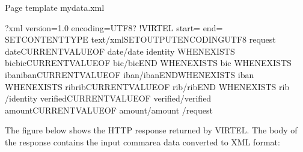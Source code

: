 \documentclass[letterpaper,10pt,english]{sphinxmanual}
\begin{document}
\begin{sphinxVerbatim}[commandchars=\\\{\}]
Page template mydata.xml

\PYGZlt{}?xml version=\PYGZdq{}1.0\PYGZdq{} encoding=\PYGZdq{}UTF\PYGZhy{}8\PYGZdq{}?\PYGZgt{}
\PYGZlt{}!\PYGZhy{}\PYGZhy{}VIRTEL start=\PYGZdq{}\PYGZob{}\PYGZob{}\PYGZob{}\PYGZdq{} end=\PYGZdq{}\PYGZcb{}\PYGZcb{}\PYGZcb{}\PYGZdq{} \PYGZhy{}\PYGZhy{}\PYGZgt{}
\PYGZob{}\PYGZob{}\PYGZob{} SET\PYGZhy{}CONTENT\PYGZhy{}TYPE \PYGZdq{}text/xml\PYGZdq{}\PYGZcb{}\PYGZcb{}\PYGZcb{}\PYGZob{}\PYGZob{}\PYGZob{}SET\PYGZhy{}OUTPUT\PYGZhy{}ENCODING\PYGZhy{}UTF\PYGZhy{}8 \PYGZdq{}\PYGZdq{}\PYGZcb{}\PYGZcb{}\PYGZcb{}
\PYGZlt{}request\PYGZgt{}
 \PYGZlt{}date\PYGZgt{}\PYGZob{}\PYGZob{}\PYGZob{}CURRENT\PYGZhy{}VALUE\PYGZhy{}OF \PYGZdq{}date\PYGZdq{}\PYGZcb{}\PYGZcb{}\PYGZcb{}\PYGZlt{}/date\PYGZgt{}
 \PYGZlt{}identity\PYGZgt{}
  \PYGZob{}\PYGZob{}\PYGZob{}WHEN\PYGZhy{}EXISTS \PYGZdq{}bic\PYGZdq{}\PYGZcb{}\PYGZcb{}\PYGZcb{}\PYGZlt{}bic\PYGZgt{}\PYGZob{}\PYGZob{}\PYGZob{}CURRENT\PYGZhy{}VALUE\PYGZhy{}OF \PYGZdq{}bic\PYGZdq{}\PYGZcb{}\PYGZcb{}\PYGZcb{}\PYGZlt{}/bic\PYGZgt{}\PYGZob{}\PYGZob{}\PYGZob{}END
 \PYGZhy{}WHEN\PYGZhy{}EXISTS \PYGZdq{}bic\PYGZdq{}\PYGZcb{}\PYGZcb{}\PYGZcb{}
  \PYGZob{}\PYGZob{}\PYGZob{}WHEN\PYGZhy{}EXISTS \PYGZdq{}iban\PYGZdq{}\PYGZcb{}\PYGZcb{}\PYGZcb{}\PYGZlt{}iban\PYGZgt{}\PYGZob{}\PYGZob{}\PYGZob{}CURRENT\PYGZhy{}VALUE\PYGZhy{}OF
 \PYGZdq{}iban\PYGZdq{}\PYGZcb{}\PYGZcb{}\PYGZcb{}\PYGZlt{}/iban\PYGZgt{}\PYGZob{}\PYGZob{}\PYGZob{}END\PYGZhy{}WHEN\PYGZhy{}EXISTS \PYGZdq{}iban\PYGZdq{}\PYGZcb{}\PYGZcb{}\PYGZcb{}
  \PYGZob{}\PYGZob{}\PYGZob{}WHEN\PYGZhy{}EXISTS \PYGZdq{}rib\PYGZdq{}\PYGZcb{}\PYGZcb{}\PYGZcb{}\PYGZlt{}rib\PYGZgt{}\PYGZob{}\PYGZob{}\PYGZob{}CURRENT\PYGZhy{}VALUE\PYGZhy{}OF \PYGZdq{}rib\PYGZdq{}\PYGZcb{}\PYGZcb{}\PYGZcb{}\PYGZlt{}/rib\PYGZgt{}\PYGZob{}\PYGZob{}\PYGZob{}END
 \PYGZhy{}WHEN\PYGZhy{}EXISTS \PYGZdq{}rib\PYGZdq{}\PYGZcb{}\PYGZcb{}\PYGZcb{}
 \PYGZlt{}/identity\PYGZgt{}
 \PYGZlt{}verified\PYGZgt{}\PYGZob{}\PYGZob{}\PYGZob{}CURRENT\PYGZhy{}VALUE\PYGZhy{}OF \PYGZdq{}verified\PYGZdq{}\PYGZcb{}\PYGZcb{}\PYGZcb{}\PYGZlt{}/verified\PYGZgt{}
 \PYGZlt{}amount\PYGZgt{}\PYGZob{}\PYGZob{}\PYGZob{}CURRENT\PYGZhy{}VALUE\PYGZhy{}OF \PYGZdq{}amount\PYGZdq{}\PYGZcb{}\PYGZcb{}\PYGZcb{}\PYGZlt{}/amount\PYGZgt{}
\PYGZlt{}/request\PYGZgt{}
\end{sphinxVerbatim}


The figure below shows the HTTP response returned by VIRTEL. The body of the response contains the input
commarea data converted to XML format:
\end{document}
